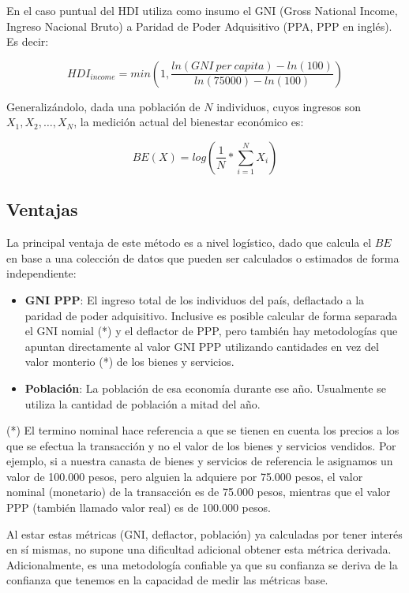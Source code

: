 En el caso puntual del HDI utiliza como insumo el GNI (Gross National Income, Ingreso Nacional Bruto) a Paridad de Poder Adquisitivo (PPA, PPP en inglés). Es decir:

$$
    HDI_{income} = min(1, \frac{ln(GNI\ per\ capita) - ln(100)}{ln(75000)-ln(100)})
$$

Generalizándolo, dada una población de $N$ individuos, cuyos ingresos son $X_1, X_2, \dots, X_N$, la medición actual del bienestar económico es:

$$
    BE(X) = log(\frac{1}{N} * \sum_{i=1}^{N}X_i)
$$

\subsection{Ventajas}

La principal ventaja de este método es a nivel logístico, dado que calcula el $BE$ en base a una colección de datos que pueden ser calculados o estimados de forma independiente:

\begin{itemize}
    \item \textbf{GNI PPP}: El ingreso total de los individuos del país, deflactado a la paridad de poder adquisitivo. Inclusive es posible calcular de forma separada el GNI nomial (*) y el deflactor de PPP, pero también hay metodologías que apuntan directamente al valor GNI PPP utilizando cantidades en vez del valor monterio (*) de los bienes y servicios. 
    \item \textbf{Población}: La población de esa economía durante ese año. Usualmente se utiliza la cantidad de población a mitad del año.
\end{itemize}

(*) El termino nominal hace referencia a que se tienen en cuenta los precios a los que se efectua la transacción y no el valor de los bienes y servicios vendidos. Por ejemplo, si a nuestra canasta de bienes y servicios de referencia le asignamos un valor de 100.000 pesos, pero alguien la adquiere por 75.000 pesos, el valor nominal (monetario) de la transacción es de 75.000 pesos, mientras que el valor PPP (también llamado valor real) es de 100.000 pesos.

Al estar estas métricas (GNI, deflactor, población) ya calculadas por tener interés en sí mismas, no supone una dificultad adicional obtener esta métrica derivada. Adicionalmente, es una metodología confiable ya que su confianza se deriva de la confianza que tenemos en la capacidad de medir las métricas base.

